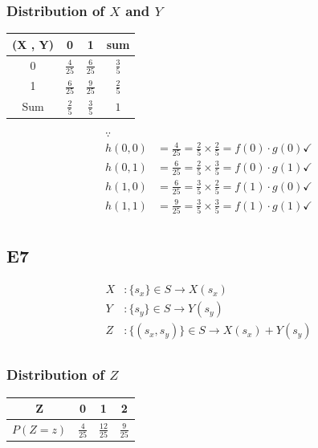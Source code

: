 \documentclass[12pt, a4paper]{article}
\begin{document}
\subsubsection*{Distribution of $X$ and $Y$}
\begin{table}[h]
\centering
\begin{tabular}{|c|c|c|c|}
\hline
(X , Y) & 0 & 1 & sum  \\
\hline
0 & $ \frac{4}{25} $ & $\frac{6}{25}$ & $\frac{3}{5}$ \\
1 & $\frac{6}{25}$ & $\frac{9}{25}$ & $\frac{2}{5}$ \\
\hline
Sum & $\frac{2}{5}$ & $\frac{3}{5}$  & $1$ \\
\hline
\end{tabular}
\end{table}

\begin{align*}
\because \\
h(0, 0) &= \frac{4}{25} = \frac{2}{5} \times \frac{2}{5} = f(0) \cdot g(0) \checkmark   \\
h(0, 1) &= \frac{6}{25} = \frac{2}{5} \times \frac{3}{5} = f(0) \cdot g(1) \checkmark	\\
h(1, 0) &= \frac{6}{25} = \frac{3}{5} \times \frac{2}{5} = f(1) \cdot g(0) \checkmark	\\
h(1, 1) &= \frac{9}{25} = \frac{3}{5} \times \frac{3}{5} = f(1) \cdot g(1) \checkmark	\\
\end{align*}


\subsection* {E7}
\begin{align*}
X &: \{s_x\} \in S \rightarrow X(s_x) \\
Y &: \{s_y\} \in S \rightarrow Y(s_y) \\
Z &:  \{ (s_x, s_y)\} \in S \rightarrow X(s_x) + Y(s_y) \\
 \end{align*}

\subsubsection*{Distribution of $Z$}
\begin{table}[h]
\centering
\begin{tabular}{|c|c|c|c|}
\hline
Z & 0 & 1 & 2 \\
\hline
$P(Z = z)$ & $\frac{4}{25}$ & $\frac{12}{25}$ & $\frac{9}{25}$ \\
\hline
\end{tabular}
\end{table}
\end{document}
